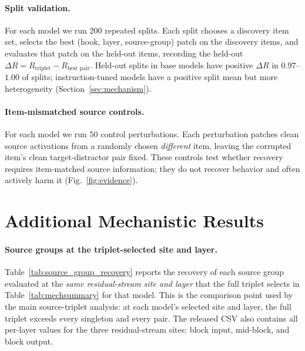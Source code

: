\documentclass[11pt]{article}
\begin{document}
\paragraph{Split validation.}
For each model we run $200$ repeated splits. Each split chooses a discovery item set, selects
the best (hook, layer, source-group) patch on the discovery items, and evaluates that patch on the
held-out items, recording the held-out $\Delta R = R_{\text{triplet}} - R_{\text{best pair}}$.
Held-out splits in base models have positive $\Delta R$ in $0.97$--$1.00$ of splits; instruction-tuned
models have a positive split mean but more heterogeneity (Section~\ref{sec:mechanism}).

\paragraph{Item-mismatched source controls.}
For each model we run $50$ control perturbations. Each perturbation patches clean source
activations from a randomly chosen \emph{different} item, leaving the corrupted item's clean
target-distractor pair fixed. These controls test whether recovery requires item-matched source
information; they do not recover behavior and often actively harm it
(Fig.~\ref{fig:evidence}).

\FloatBarrier
\section{Additional Mechanistic Results}
\label{app:mech_extra}

\paragraph{Source groups at the triplet-selected site and layer.}
Table~\ref{tab:source_group_recovery} reports the recovery of each source group evaluated at
the \emph{same residual-stream site and layer} that the full triplet selects in
Table~\ref{tab:mechsummary} for that model. This is the comparison point used by the main
source-triplet analysis: at each model's selected site and layer, the full triplet exceeds
every singleton and every pair. The released CSV also contains all per-layer values for the
three residual-stream sites: block input, mid-block, and block output.
\end{document}
